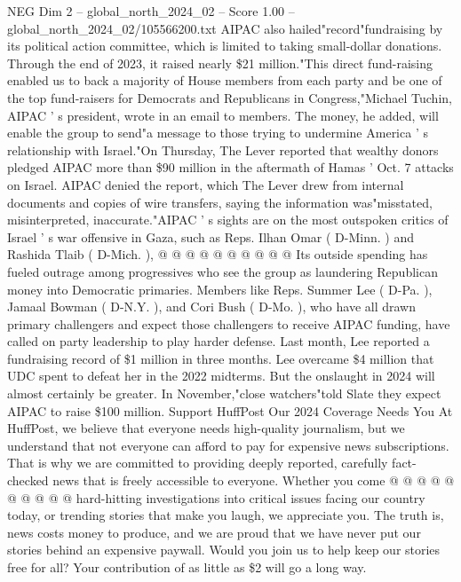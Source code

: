 \begin{textsample}{NEG Dim 2 – global\_north\_2024\_02 – Score 1.00 – global\_north\_2024\_02/105566200.txt}  \label{ex:f2_neg_174}
AIPAC also hailed"record"fundraising by its political action committee, which is limited to taking small-dollar donations.
Through the end of 2023, it raised nearly \$21 million."This direct fund-raising enabled us to back a majority of House members from each party and be one of the top fund-raisers for Democrats and Republicans in Congress,"Michael Tuchin, AIPAC ' s president, wrote in an email to members.
The money, he added, will enable the group to send"a message to those trying to undermine America ' s relationship with Israel."On Thursday, The Lever reported that wealthy donors pledged AIPAC more than \$90 million in the aftermath of Hamas ' Oct. 7 attacks on Israel.
AIPAC denied the report, which The Lever drew from internal documents and copies of wire transfers, saying the information was"misstated, misinterpreted, inaccurate."AIPAC ' s sights are on the most outspoken critics of Israel ' s war offensive in Gaza, such as Reps.
Ilhan Omar ( D-Minn. ) and Rashida Tlaib ( D-Mich. ), @ @ @ @ @ @ @ @ @ @ Its outside spending has fueled outrage among progressives who see the group as laundering Republican money into Democratic primaries.
Members like Reps.
Summer Lee ( D-Pa. ), Jamaal Bowman ( D-N.Y. ), and Cori Bush ( D-Mo. ), who have all drawn primary challengers and expect those challengers to receive AIPAC funding, have called on party leadership to play harder defense.
Last month, Lee reported a fundraising record of \$1 million in three months.
Lee overcame \$4 million that UDC spent to defeat her in the 2022 midterms.
But the onslaught in 2024 will almost certainly be greater.
In November,"close watchers"told Slate they expect AIPAC to raise \$100 million.
Support HuffPost Our 2024 Coverage Needs You At HuffPost, we believe that everyone needs high-quality journalism, but we understand that not everyone can afford to pay for expensive news subscriptions.
That is why we are committed to providing deeply reported, carefully fact-checked news that is freely accessible to everyone.
Whether you come @ @ @ @ @ @ @ @ @ @ hard-hitting investigations into critical issues facing our country today, or trending stories that make you laugh, we appreciate you.
The truth is, news costs money to produce, and we are proud that we have never put our stories behind an expensive paywall.
Would you join us to help keep our stories free for all?
Your contribution of as little as \$2 will go a long way.

\end{textsample}
